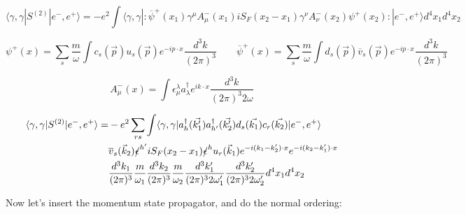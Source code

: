 \documentclass[a4]{article}
\begin{document}
        \begin{framed}

            \begin{equation}
                \langle \gamma, \gamma | S^{(2)} | e^{-}, e^{+} \rangle = -e^{2} \int \langle \gamma, \gamma |:\overline{\psi}^{+} (x_1) \gamma^{\mu} A_{\mu}^{-} (x_1) i S_{F} (x_2 - x_1) \gamma^{\nu} A_{\nu}^{-} (x_2) \psi^{+} (x_2):| e^{-}, e^{+} \rangle d^4 x_1 d^4 x_2
            \end{equation}

            \begin{equation}
                \psi^{+} (x) = \sum_{s} \frac{m}{\omega} \int c_{s} (\vec{p}) u_{s} (\vec{p}) e^{- i p \cdot x} \frac{d^3 k}{(2 \pi)^{3}} \qquad \overline{\psi}^{+} (x) = \sum_{s} \frac{m}{\omega} \int d_{s} (\vec{p}) \overline{v}_{s} (\vec{p}) e^{- i p \cdot x} \frac{d^3 k}{(2 \pi)^{3}}
            \end{equation}

            \begin{equation}
                A_{\mu}^{-} (x) = \int \epsilon^{\lambda}_{\mu} a^{\dagger}_{\lambda} e^{i k \cdot x} \frac{d^3 k}{(2 \pi)^{3} 2 \omega}
            \end{equation}

            \begin{equation}
                \begin{aligned}
                    \langle \gamma, \gamma | S^{(2)} | e^{-}, e^{+} \rangle = & - e^{2} \sum_{r s} \int \langle \gamma, \gamma |a^{\dagger}_{h} (\vec{k'_1}) a^{\dagger}_{h'} (\vec{k'_2}) d_{s} (\vec{k_1}) c_{r} (\vec{k_2})| e^{-}, e^{+} \rangle \\
                    & \overline{v}_{s} (\vec{k}_2) \slashed{\epsilon}^{h'} i S_{F} (x_2 - x_1) \slashed{\epsilon}^{h} u_{r} (\vec{k}_1) e^{- i (k_1 - k'_2) \cdot x} e^{- i (k_2 - k'_1) \cdot x} \\
                    & \frac{d^3 k_1}{(2 \pi)^{3}} \frac{m}{\omega_1} \frac{d^3 k_2}{(2 \pi)^{3}} \frac{m}{\omega_2} \frac{d^3 k'_1}{(2 \pi)^{3} 2 \omega'_1} \frac{d^3 k'_2}{(2 \pi)^{3} 2 \omega'_2} d^4 x_1 d^4 x_2
                \end{aligned}
            \end{equation}

            Now let's insert the momentum state propagator, and do the normal ordering:


\end{framed}
\end{document}
